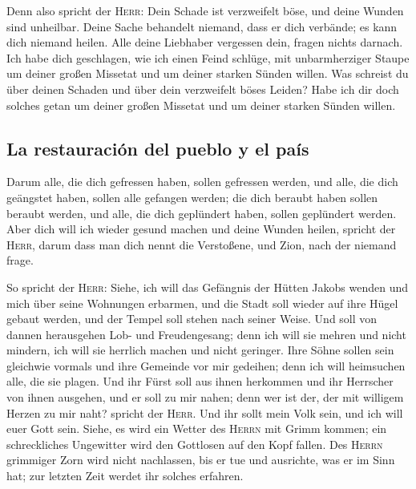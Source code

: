  Denn also spricht der \textsc{Herr}: Dein Schade ist
verzweifelt böse, und deine Wunden sind unheilbar.  Deine
Sache behandelt niemand, dass er dich verbände; es kann dich niemand
heilen.  Alle deine Liebhaber vergessen dein, fragen
nichts darnach. Ich habe dich geschlagen, wie ich einen Feind schlüge,
mit unbarmherziger Staupe um deiner großen Missetat und um deiner
starken Sünden willen.  Was schreist du über deinen
Schaden und über dein verzweifelt böses Leiden? Habe ich dir doch
solches getan um deiner großen Missetat und um deiner starken Sünden
willen.

\hypertarget{la-restauraciuxf3n-del-pueblo-y-el-pauxeds}{%
\subsection{La restauración del pueblo y el
país}\label{la-restauraciuxf3n-del-pueblo-y-el-pauxeds}}

 Darum alle, die dich gefressen haben, sollen gefressen
werden, und alle, die dich geängstet haben, sollen alle gefangen werden;
die dich beraubt haben sollen beraubt werden, und alle, die dich
geplündert haben, sollen geplündert werden.  Aber dich
will ich wieder gesund machen und deine Wunden heilen, spricht der
\textsc{Herr}, darum dass man dich nennt die Verstoßene, und Zion, nach
der niemand frage.

 So spricht der \textsc{Herr}: Siehe, ich will das
Gefängnis der Hütten Jakobs wenden und mich über seine Wohnungen
erbarmen, und die Stadt soll wieder auf ihre Hügel gebaut werden, und
der Tempel soll stehen nach seiner Weise.  Und soll von
dannen herausgehen Lob- und Freudengesang; denn ich will sie mehren und
nicht mindern, ich will sie herrlich machen und nicht geringer.
 Ihre Söhne sollen sein gleichwie vormals und ihre
Gemeinde vor mir gedeihen; denn ich will heimsuchen alle, die sie
plagen.  Und ihr Fürst soll aus ihnen herkommen und ihr
Herrscher von ihnen ausgehen, und er soll zu mir nahen; denn wer ist
der, der mit willigem Herzen zu mir naht? spricht der \textsc{Herr}.
 Und ihr sollt mein Volk sein, und ich will euer Gott
sein.  Siehe, es wird ein Wetter des \textsc{Herrn} mit
Grimm kommen; ein schreckliches Ungewitter wird den Gottlosen auf den
Kopf fallen.  Des \textsc{Herrn} grimmiger Zorn wird
nicht nachlassen, bis er tue und ausrichte, was er im Sinn hat; zur
letzten Zeit werdet ihr solches erfahren.


